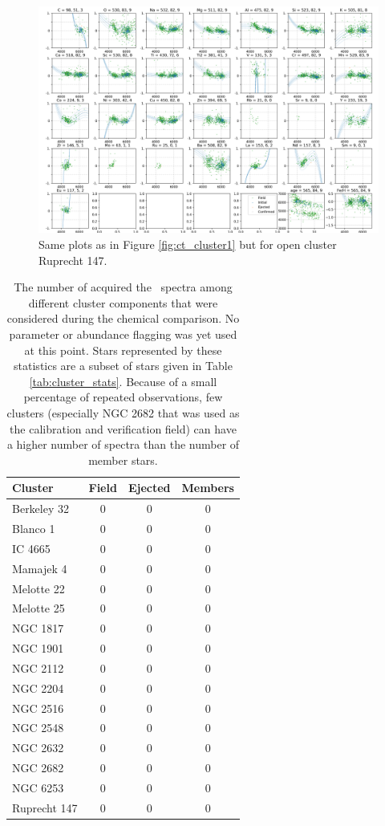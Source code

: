 \begin{figure}
	\centering
	\includegraphics[width=\textwidth]{p_teff_abundances_Ruprecht_147_orbits_DR3_new_flag0.png}
	\caption{Same plots as in Figure \ref{fig:ct_cluster1} but for open cluster Ruprecht 147.}
	\label{fig:ct_cluster4}
\end{figure}

\begin{table}
	\centering
	\caption{The number of acquired the \Gh\ spectra among different cluster components that were considered during the chemical comparison. No parameter or abundance flagging was yet used at this point. Stars represented by these statistics are a subset of stars given in Table \ref{tab:cluster_stats}. Because of a small percentage of repeated observations, few clusters (especially NGC 2682 that was used as the calibration and verification field) can have a higher number of spectra than the number of member stars.}
	\begin{tabular}{l | c | c | c }
		\hline
		Cluster & Field & Ejected & Members \\
		\hline
		Berkeley 32  & 0 & 0 & 0 \\ 
		Blanco 1     & 0 & 0 & 0 \\
		IC 4665      & 0 & 0 & 0 \\
		Mamajek 4    & 0 & 0 & 0 \\
		Melotte 22   & 0 & 0 & 0 \\
		Melotte 25   & 0 & 0 & 0 \\
		NGC 1817     & 0 & 0 & 0 \\
		NGC 1901     & 0 & 0 & 0 \\
		NGC 2112     & 0 & 0 & 0 \\
		NGC 2204     & 0 & 0 & 0 \\
		NGC 2516     & 0 & 0 & 0 \\
		NGC 2548     & 0 & 0 & 0 \\
		NGC 2632     & 0 & 0 & 0 \\
		NGC 2682     & 0 & 0 & 0 \\
		NGC 6253     & 0 & 0 & 0 \\
		Ruprecht 147 & 0 & 0 & 0 \\
		\hline
	\end{tabular}
	\label{tab:cluster_stats_abund}
\end{table}


